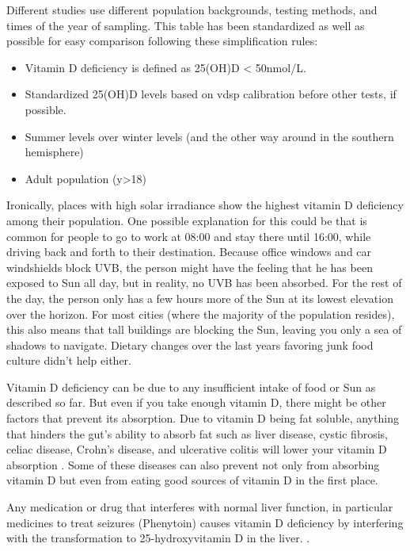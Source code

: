 Different studies use different population backgrounds, testing methods, and times of the year of sampling. This table has been standardized as well as possible for easy comparison following these simplification rules:

\begin{itemize}
    \item Vitamin D deficiency is defined as 25(OH)D < 50nmol/L.
    \item Standardized 25(OH)D levels based on \gls{vdsp} calibration before other tests, if possible.
    \item Summer levels over winter levels (and the other way around in the southern hemisphere)
    \item Adult population (y>18)
\end{itemize}

Ironically, places with high solar irradiance show the highest vitamin D deficiency among their population. One possible explanation for this could be that is common for people to go to work at 08:00 and stay there until 16:00, while driving back and forth to their destination. Because office windows and car windshields block UVB, the person might have the feeling that he has been exposed to Sun all day, but in reality, no UVB has been absorbed. For the rest of the day, the person only has a few hours more of the Sun at its lowest elevation over the horizon. For most cities (where the majority of the population resides), this also means that tall buildings are blocking the Sun, leaving you only a sea of shadows to navigate. Dietary changes over the last years favoring junk food culture didn't help either.

Vitamin D deficiency can be due to any insufficient intake of food or Sun as described so far. But even if you take enough vitamin D, there might be other factors that prevent its absorption. Due to vitamin D being fat soluble, anything that hinders the gut's ability to absorb fat such as liver disease, cystic fibrosis, celiac disease, Crohn’s disease, and ulcerative colitis will lower your vitamin D absorption \cite{ref:Pappa2008}. Some of these diseases can also prevent not only from absorbing vitamin D but even from eating good sources of vitamin D in the first place.

Any medication or drug that interferes with normal liver function, in particular medicines to treat seizures (Phenytoin) causes vitamin D deficiency by interfering with the transformation to 25-hydroxyvitamin D in the liver. \cite{ref:MiratashiYazdi2017, ref:Bell1979, ref:Faridi2010}. \vspace{3 mm}


